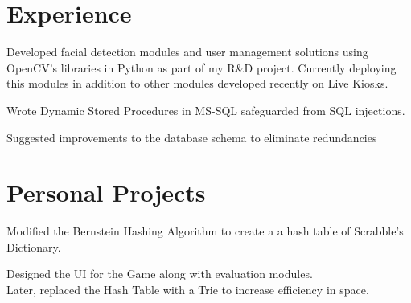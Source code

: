\documentclass[]{deedy-resume-openfont}
\begin{document}
\begin{minipage}[t]{0.66\textwidth} 



\section{Experience}

\vspace{\topsep} %
\begin{tightemize}\item Developed facial detection modules and user management solutions using OpenCV's libraries in Python as part of my R\&D project.
Currently deploying this modules in addition to other modules developed recently on Live Kiosks.
\end{tightemize}
\sectionsep

\begin{tightemize}


\item Wrote Dynamic Stored Procedures in MS-SQL safeguarded from SQL injections.

\item Suggested improvements to the database schema to eliminate redundancies


\end{tightemize}
\sectionsep


\sectionsep


\section{Personal Projects}




Modified the Bernstein Hashing Algorithm to create a a hash table of Scrabble's Dictionary.
\item Designed the UI for the Game along with evaluation modules.\\
Later, replaced the Hash Table with a Trie to increase efficiency in space.


\end{minipage}
\end{document}
